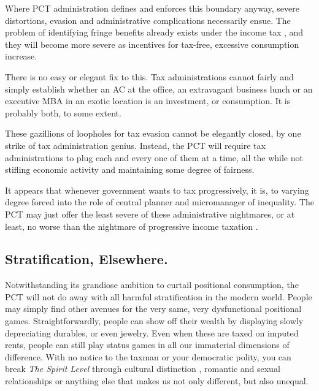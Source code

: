 
Where PCT administration defines and enforces this boundary anyway, severe distortions, evasion and administrative complications necessarily ensue.
The problem of identifying fringe benefits already exists under the income tax \citep[1591]{Graetz2009}, and they will become more severe as incentives for tax-free, excessive consumption increase.

There is no easy or elegant fix to this.
Tax administrations cannot fairly and simply establish whether an AC at the office, an extravagant business lunch or an executive MBA in an exotic location is an investment, or consumption.
It is probably both, to some extent.

These gazillions of loopholes for tax evasion cannot be elegantly closed, by one strike of tax administration genius.
Instead, the PCT will require tax administrations to plug each and every one of them at a time, all the while not stifling economic activity and maintaining some degree of fairness.

It appears that whenever government wants to tax progressively, it is, to varying degree forced into the role of central planner and micromanager of inequality.
The PCT may just offer the least severe of these administrative nightmares, or at least, no worse than the nightmare of progressive income taxation \citep[1595]{Graetz2009}.

\subsection{Stratification, Elsewhere.}
Notwithstanding its grandiose ambition to curtail positional consumption, the PCT will not do away with all harmful stratification in the modern world.
People may simply find other avenues for the very same, very dysfunctional positional games.
Straightforwardly, people can show off their wealth by displaying slowly depreciating durables, or even jewelry.
Even when these are taxed on imputed rents, people can still play status games in all our immaterial dimensions of difference.
With no notice to the taxman or your democratic polity, you can break \emph{The Spirit Level} \citep{Pickett-2009-kx} through cultural distinction \citep{Bourdieu-1984-aa}, romantic and sexual relationships \citep{Mazur-1993-aa} or anything else that makes us not only different, but also unequal.

